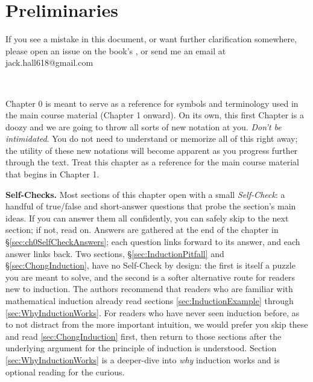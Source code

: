 

\chapter{Preliminaries}
If you see a mistake in this document, or want further clarification somewhere, please open an issue on the book's \href{https://github.com/hilikliming/modern_algebra_with_friends}{}, or send me an email at jack.hall618@gmail.com \\
\noindent
\begin{tcolorbox}
    \begin{center}
\\
    \end{center}
\end{tcolorbox}


\bigbreak
\noindent Chapter 0 is meant to serve as a reference for symbols and terminology used in the main course material (Chapter 1 onward). On its own, this first Chapter is a doozy and we are going to throw all sorts of new notation at you. \textit{Don't be intimidated}. You do not need to understand or memorize all of this right away; the utility of these new notations will become apparent as you progress further through the text. Treat this chapter as a reference for the main course material that begins in Chapter 1.

\medskip
\noindent \textbf{Self-Checks.} Most sections of this chapter open with a small \textit{Self-Check}: a handful of true/false and short-answer questions that probe the section's main ideas. If you can answer them all confidently, you can safely skip to the next section; if not, read on. Answers are gathered at the end of the chapter in \S\ref{sec:ch0SelfCheckAnswers}; each question links forward to its answer, and each answer links back. Two sections, \S\ref{sec:InductionPitfall} and \S\ref{sec:ChongInduction}, have no Self-Check by design: the first is itself a puzzle you are meant to solve, and the second is a softer alternative route for readers new to induction. The authors recommend that readers who are familiar with mathematical induction already read sections \ref{sec:InductionExample} through \ref{sec:WhyInductionWorks}. For readers who have never seen induction before, as to not distract from the more important intuition, we would prefer you skip these and read \ref{sec:ChongInduction} first, then return to those sections after the underlying argument for the principle of induction is understood. Section \ref{sec:WhyInductionWorks} is a deeper-dive into \textit{why} induction works and is optional reading for the curious.

